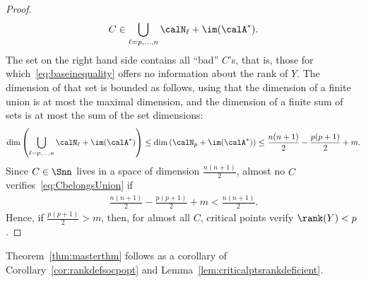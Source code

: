 \documentclass{article}
\newcommand{\1}{\mathbf{1}}
\begin{document}
\begin{proof}
	\begin{align}
	C \in \bigcup_{\ell = p,\ldots,n} \calN_\ell + \im(\calA^*).
	\label{eq:CbelongsUnion}
	\end{align}
	The set on the right hand side contains all ``bad'' $C$'s, that is, those for which~\eqref{eq:baseinequality} offers no information about the rank of $Y$. The dimension of that set is bounded as follows, using that the dimension of a finite union is at most the maximal dimension, and the dimension of a finite sum of sets is at most the sum of the set dimensions:
	\begin{align*}
	\dim\left( \bigcup_{\ell = p,\ldots,n} \calN_\ell + \im(\calA^*) \right) \leq \dim\left( \calN_p + \im(\calA^*) \right) \leq \frac{n(n+1)}{2} - \frac{p(p+1)}{2} + m.
	\end{align*}
	Since $C\in\Snn$ lives in a space of dimension $\frac{n(n+1)}{2}$, almost no $C$ verifies~\eqref{eq:CbelongsUnion} if
	\begin{align*}
	\frac{n(n+1)}{2} - \frac{p(p+1)}{2} + m < \frac{n(n+1)}{2}.
	\end{align*}
	Hence, if $\frac{p(p+1)}{2} > m$, then, for almost all $C$, critical points verify $\rank(Y) < p$.
\end{proof}
Theorem~\ref{thm:masterthm} follows as a corollary of Corollary~\ref{cor:rankdefsocpopt} and Lemma~\ref{lem:criticalptsrankdeficient}.
\end{document}
